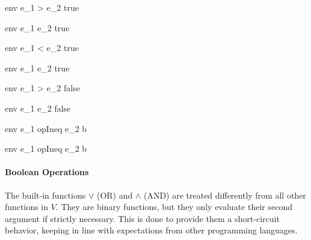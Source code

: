\documentclass{article}
\begin{document}
    {\mbox{env} \vdash e_1 > e_2 \Downarrow true}

    {\mbox{env} \vdash e_1 \geq e_2 \Downarrow true}

\medskip

    {\mbox{env} \vdash e_1 < e_2 \Downarrow true}

    {\mbox{env} \vdash e_1 \leq e_2 \Downarrow true}

    {\mbox{env} \vdash e_1 > e_2 \Downarrow false}

    {\mbox{env} \vdash e_1 \geq e_2 \Downarrow false}

\medskip

\medskip

    {\mbox{env} \vdash e_1 \; opIneq \; e_2 \Downarrow b}

    {\mbox{env} \vdash e_1 \; opIneq \; e_2 \Downarrow b}

\paragraph{Boolean Operations}

The built-in functions $\vee$ (OR) and $\wedge$ (AND) are treated differently from all other functions in $V$.
They are binary functions, but they only evaluate their second argument if strictly necessary.
This is done to provide them a short-circuit behavior, keeping in line with expectations from other programming languages.
\end{document}
